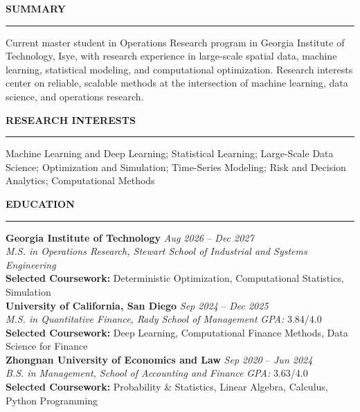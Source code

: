 \documentclass{../original_CV/resume}
\renewcommand{\sectionskip}{\vspace{0.10cm}}
\renewcommand{\sectionlineskip}{\vspace{0.10cm}}
\renewenvironment{rSection}[1]{
\sectionskip
\textcolor{UC San Diego Blue}{\textbf{\large\bfseries\MakeUppercase{#1}}}
\sectionlineskip
\hrule
\begin{list}{}{\setlength{\leftmargin}{0em}}
\item[]
}{\end{list}}
\begin{document}
\thispagestyle{empty}

\begin{rSection}{SUMMARY}
Current master student in Operations Research program in Georgia Institute of Technology, Isye, with research experience in large-scale spatial data, machine learning, statistical modeling, and computational optimization. Research interests center on reliable, scalable methods at the intersection of machine learning, data science, and operations research.
\end{rSection}

\begin{rSection}{RESEARCH INTERESTS}
Machine Learning and Deep Learning; Statistical Learning; Large-Scale Data Science; Optimization and Simulation; Time-Series Modeling; Risk and Decision Analytics; Computational Methods
\end{rSection}

\begin{rSection}{EDUCATION}
{\bf Georgia Institute of Technology} \hfill {\em Aug 2026} -- {\em Dec 2027}
\\ \textit{M.S. in Operations Research, Stewart School of Industrial and Systems Engineering} \\
\textbf{Selected Coursework:} Deterministic Optimization, Computational Statistics, Simulation
\\[1pt]
{\bf University of California, San Diego} \hfill {\em Sep 2024} -- {\em Dec 2025}
\\ \textit{M.S. in Quantitative Finance, Rady School of Management} \hfill \textit{GPA:} 3.84/4.0 \\
\textbf{Selected Coursework:} Deep Learning, Computational Finance Methods, Data Science for Finance
\\[1pt]
{\bf Zhongnan University of Economics and Law} \hfill {\em Sep 2020} -- {\em Jun 2024}
\\ \textit{B.S. in Management, School of Accounting and Finance} \hfill \textit{GPA:} 3.63/4.0 \\
\textbf{Selected Coursework:} Probability \& Statistics, Linear Algebra, Calculus, Python Programming
\end{rSection}
\end{document}
